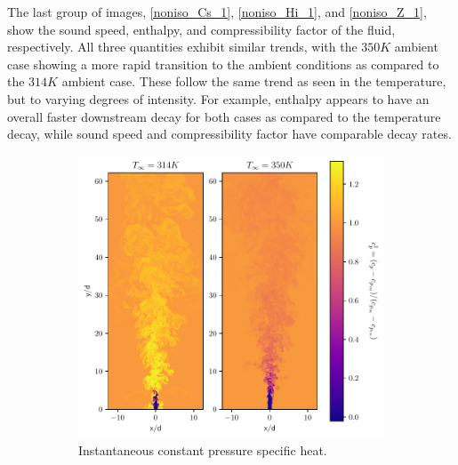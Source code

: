 The last group of images, \ref{noniso_Cs_1}, \ref{noniso_Hi_1}, and \ref{noniso_Z_1}, show the sound speed, enthalpy, and compressibility factor of the fluid, respectively. All three quantities exhibit similar trends, with the $350 K$ ambient case showing a more rapid transition to the ambient conditions as compared to the $314 K$ ambient case. These follow the same trend as seen in the temperature, but to varying degrees of intensity. For example, enthalpy appears to have an overall faster downstream decay for both cases as compared to the temperature decay, while sound speed and compressibility factor have comparable decay rates. 

\begin{figure}[H]
\begin{subfigure}{0.5\textwidth}
	\centering
	\includegraphics[scale=.45]{figures/Plots/vertical/cp_scaled_vert_noniso.pdf}
	\caption{Instantaneous constant pressure specific heat.} \label{noniso_cp_1}
\end{subfigure}
\hfill
\begin{subfigure}{0.5\textwidth}
	\centering

\end{subfigure}
\end{figure}
